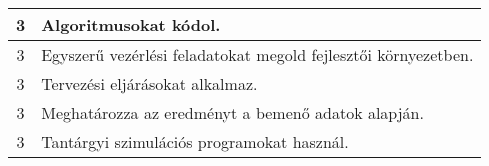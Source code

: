 \begin{longtable}{c | p{12cm} }
                                
                                          3 &  Algoritmusokat kódol. \\ \hline
                                          3 &  Egyszerű vezérlési feladatokat megold fejlesztői környezetben. \\ \hline
                                          3 &  Tervezési eljárásokat alkalmaz. \\ \hline
                                          3 &  Meghatározza az eredményt a bemenő adatok alapján. \\ \hline
                                          3 &  Tantárgyi szimulációs programokat használ. \\ \hline
                                      
                        \end{longtable}
            \clearpage

